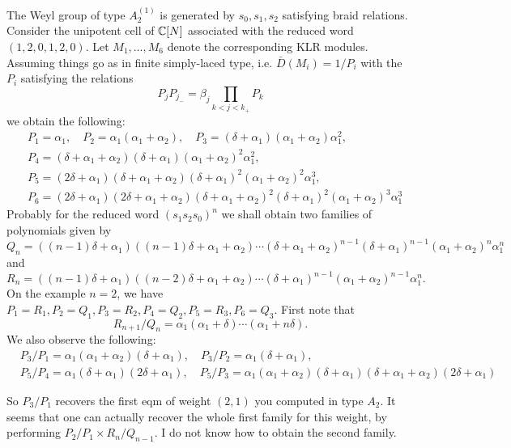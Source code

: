 \documentclass[11pt]{article}
\begin{document}
The Weyl group of type $A_2^{(1)}$ is generated by $s_0,s_1,s_2$ satisfying braid relations. 
Consider the unipotent cell of $\mathbb{C}[N]$ associated with the reduced word $(1,2,0,1,2,0)$. Let $M_1, \ldots , M_6$ denote the corresponding KLR modules. Assuming things go as in finite simply-laced type, i.e. $\bar{D}(M_i) = 1/P_i$ with the $P_i$ satisfying the relations 
$$ P_j P_{j_{-}} = \beta_j \prod_{k < j < k_{+}} P_k $$
we obtain the following:
$$
\begin{aligned}
  & P_1 = \alpha_1 , \quad  P_2 = \alpha_1(\alpha_1 + \alpha_2) , \quad   P_3 = (\delta + \alpha_1)(\alpha_1 + \alpha_2)\alpha_1^2 , \\
  & P_4 = (\delta + \alpha_1 + \alpha_2)(\delta + \alpha_1)(\alpha_1 + \alpha_2)^{2}\alpha_1^2 , \\
  & P_5 = (2 \delta  + \alpha_1)(\delta + \alpha_1 + \alpha_2)(\delta + \alpha_1)^{2}(\alpha_1 + \alpha_2)^{2}\alpha_1^{3} , \\
  & P_6 = (2 \delta  + \alpha_1)(2 \delta + \alpha_1 + \alpha_2)(\delta + \alpha_1 + \alpha_2)^{2}(\delta + \alpha_1)^{2}(\alpha_1 + \alpha_2)^{3}\alpha_1^{3}
\end{aligned}
$$
Probably for the reduced word $(s_1s_2s_0)^n$ we shall obtain two families of polynomials given by 
$$ Q_n = ((n-1) \delta  + \alpha_1)((n-1) \delta + \alpha_1 + \alpha_2) \cdots (\delta + \alpha_1 + \alpha_2)^{n-1}(\delta + \alpha_1)^{n-1}(\alpha_1 + \alpha_2)^{n}\alpha_1^{n} $$
and 
$$ R_n = ((n-1) \delta  + \alpha_1)((n-2) \delta + \alpha_1 + \alpha_2) \cdots (\delta + \alpha_1)^{n-1}(\alpha_1 + \alpha_2)^{n-1}\alpha_1^{n} . $$
On the example $n=2$, we have $P_1=R_1, P_2=Q_1, P_3=R_2, P_4=Q_2, P_5=R_3, P_6=Q_3$.
First note that 
$$ R_{n+1} / Q_n = \alpha_1(\alpha_1 + \delta) \cdots (\alpha_1 + n \delta) . $$
We also observe the following:
$$   
\begin{aligned}
  & P_3 / P_{1} = \alpha_1(\alpha_1 + \alpha_2)(\delta + \alpha_1), \quad  P_3 / P_2 = \alpha_1(\delta + \alpha_1), \\
  & P_5 / P_4 = \alpha_1(\delta + \alpha_1)(2 \delta + \alpha_1), \quad  P_5 / P_3 = \alpha_1(\alpha_1 + \alpha_2)(\delta + \alpha_1)(\delta + \alpha_1 + \alpha_2)(2 \delta + \alpha_1)
\end{aligned}
$$    
\bigskip    
     
So $P_3 / P_1$ recovers the first eqm of weight $(2,1)$ you computed in type $A_2$. It seems that one can actually recover the whole first family for this weight, by performing $P_2 / P_1 \times R_n / Q_{n-1}$. I do not know how to obtain the second family. 
\end{document}
